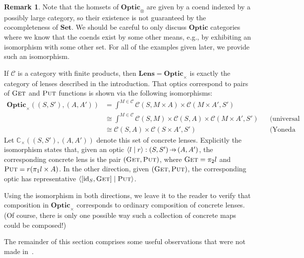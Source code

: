 \documentclass[11pt,letterpaper]{article}
\theoremstyle{plain}
\theoremstyle{definition}
\newtheorem{remark}[theorem]{Remark}
\newcommand{\C}{\mathscr{C}}
\newcommand{\Set}{\mathbf{Set}}
\newcommand{\Optic}{\mathbf{Optic}}
\newcommand{\Lens}{\mathbf{Lens}}
\newcommand{\conc}{\mathbb{C}}
\newcommand{\id}{\mathrm{id}}
\newcommand{\rep}[2]{{\ensuremath \left\langle #1 \mid #2 \right\rangle}}
\newcommand{\fget}{\textsc{Get}}
\newcommand{\fput}{\textsc{Put}}
\newcommand{\hto}{\ensuremath{\,\mathaccent\shortmid\rightarrow\,}}
\begin{document}
\begin{remark}
  Note that the homsets of $\Optic_\otimes$ are given by a coend indexed by a possibly large category, so their existence is not guaranteed by the cocompleteness of $\Set$. We should be careful to only discuss $\Optic$ categories where we know that the coends exist by some other means, e.g., by exhibiting an isomorphism with some other set. For all of the examples given later, we provide such an isomorphism.
\end{remark}

If $\C$ is a category with finite products, then $\Lens = \Optic_\times$ is exactly the category of lenses described in the introduction. That optics correspond to pairs of $\fget$ and $\fput$ functions is shown via the following isomorphisms:
\begin{align*}
  \Optic_\times((S, S'), (A, A')) 
  &= \int^{M \in \C} \C(S, M \times A) \times \C(M \times A', S') \\
  &\cong \int^{M \in \C} \C(S, M) \times \C(S, A) \times \C(M \times A', S') && \text{(universal property of product)} \\
  &\cong \C(S, A) \times \C(S \times A', S') && \text{(Yoneda reduction)}
\end{align*}
Let $\conc_\times((S, S'), (A, A'))$ denote this set of concrete lenses. Explicitly the isomorphism states that, given an optic $\rep{l}{r} : (S, S') \hto (A, A')$, the corresponding concrete lens is the pair $(\fget, \fput)$, where $\fget = \pi_2 l$ and $\fput = r (\pi_1 l \times A)$. In the other direction, given $(\fget, \fput)$, the corresponding optic has representative $\rep{[\id_S, \fget]}{\fput}$.

Using the isomorphism in both directions, we leave it to the reader to verify that composition in $\Optic_\times$ corresponds to ordinary composition of concrete lenses. (Of course, there is only one possible way such a collection of concrete maps could be composed!)

The remainder of this section comprises some useful observations that were not made in~\cite{Doubles}.
\end{document}

